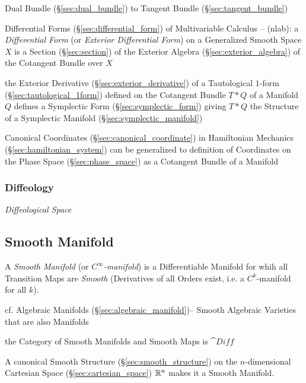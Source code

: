 Dual Bundle (\S\ref{sec:dual_bundle}) to Tangent Bundle
(\S\ref{sec:tangent_bundle})

\fist Differential Forms (\S\ref{sec:differential_form}) of Multivariable
Calculus -- (nlab): a \emph{Differential Form} (or \emph{Exterior Differential
  Form}) on a Generalized Smooth Space $X$ is a Section (\S\ref{sec:section}) of
the Exterior Algebra (\S\ref{sec:exterior_algebra}) of the Cotangent Bundle over
$X$

the Exterior Derivative (\S\ref{sec:exterior_derivative}) of a Tautological
$1$-form (\S\ref{sec:tautological_1form}) defined on the Cotangent Bundle $T *
Q$ of a Manifold $Q$ defines a Symplectic Form (\S\ref{sec:symplectic_form})
giving $T * Q$ the Structure of a Symplectic Manifold
(\S\ref{sec:symplectic_manifold})

Canonical Coordinates (\S\ref{sec:canonical_coordinate}) in Hamiltonian
Mechanics (\S\ref{sec:hamiltonian_system}) can be generalized to definition of
Coordinates on the Phase Space (\S\ref{sec:phase_space}) as a Cotangent Bundle
of a Manifold



\subsubsection{Diffeology}\label{sec:diffeology}

\emph{Diffeological Space}



\subsection{Smooth Manifold}\label{sec:smooth_manifold}

A \emph{Smooth Manifold} (or \emph{$C^\infty$-manifold}) is a Differentiable
Manifold for whih all Transition Maps are \emph{Smooth} (Derivatives of
all Orders exist, i.e. a $C^k$-manifold for all $k$).

\fist cf. Algebraic Manifolds (\S\ref{sec:algebraic_manifold})-- Smooth
Algebraic Varieties that are also Manifolds

the Category of Smooth Manifolds and Smooth Maps is $\cat{Diff}$

A canonical Smooth Structure (\S\ref{sec:smooth_structure}) on the
$n$-dimensional Cartesian Space (\S\ref{sec:cartesian_space}) $\mathbb{R}^n$ makes
it a Smooth Manifold.

